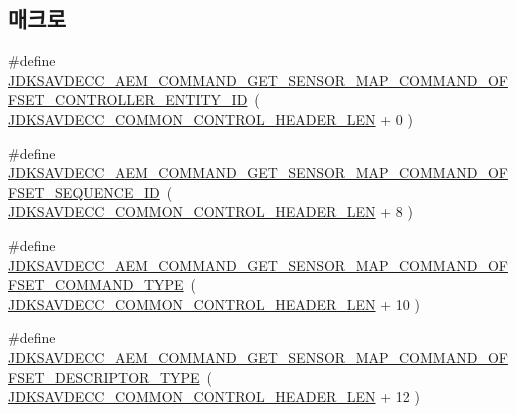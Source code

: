 \subsection*{매크로}
\begin{DoxyCompactItemize}
\item 
\#define \hyperlink{group__command__get__sensor__map_gaa9a59eb95c2f583d5b3abeebe3a434fd}{J\+D\+K\+S\+A\+V\+D\+E\+C\+C\+\_\+\+A\+E\+M\+\_\+\+C\+O\+M\+M\+A\+N\+D\+\_\+\+G\+E\+T\+\_\+\+S\+E\+N\+S\+O\+R\+\_\+\+M\+A\+P\+\_\+\+C\+O\+M\+M\+A\+N\+D\+\_\+\+O\+F\+F\+S\+E\+T\+\_\+\+C\+O\+N\+T\+R\+O\+L\+L\+E\+R\+\_\+\+E\+N\+T\+I\+T\+Y\+\_\+\+ID}~( \hyperlink{group__jdksavdecc__avtp__common__control__header_gaae84052886fb1bb42f3bc5f85b741dff}{J\+D\+K\+S\+A\+V\+D\+E\+C\+C\+\_\+\+C\+O\+M\+M\+O\+N\+\_\+\+C\+O\+N\+T\+R\+O\+L\+\_\+\+H\+E\+A\+D\+E\+R\+\_\+\+L\+EN} + 0 )
\item 
\#define \hyperlink{group__command__get__sensor__map_ga4b0d0dd01100da0863472c2b5c012793}{J\+D\+K\+S\+A\+V\+D\+E\+C\+C\+\_\+\+A\+E\+M\+\_\+\+C\+O\+M\+M\+A\+N\+D\+\_\+\+G\+E\+T\+\_\+\+S\+E\+N\+S\+O\+R\+\_\+\+M\+A\+P\+\_\+\+C\+O\+M\+M\+A\+N\+D\+\_\+\+O\+F\+F\+S\+E\+T\+\_\+\+S\+E\+Q\+U\+E\+N\+C\+E\+\_\+\+ID}~( \hyperlink{group__jdksavdecc__avtp__common__control__header_gaae84052886fb1bb42f3bc5f85b741dff}{J\+D\+K\+S\+A\+V\+D\+E\+C\+C\+\_\+\+C\+O\+M\+M\+O\+N\+\_\+\+C\+O\+N\+T\+R\+O\+L\+\_\+\+H\+E\+A\+D\+E\+R\+\_\+\+L\+EN} + 8 )
\item 
\#define \hyperlink{group__command__get__sensor__map_gad367e17d0f570f99959560ea3fad2a43}{J\+D\+K\+S\+A\+V\+D\+E\+C\+C\+\_\+\+A\+E\+M\+\_\+\+C\+O\+M\+M\+A\+N\+D\+\_\+\+G\+E\+T\+\_\+\+S\+E\+N\+S\+O\+R\+\_\+\+M\+A\+P\+\_\+\+C\+O\+M\+M\+A\+N\+D\+\_\+\+O\+F\+F\+S\+E\+T\+\_\+\+C\+O\+M\+M\+A\+N\+D\+\_\+\+T\+Y\+PE}~( \hyperlink{group__jdksavdecc__avtp__common__control__header_gaae84052886fb1bb42f3bc5f85b741dff}{J\+D\+K\+S\+A\+V\+D\+E\+C\+C\+\_\+\+C\+O\+M\+M\+O\+N\+\_\+\+C\+O\+N\+T\+R\+O\+L\+\_\+\+H\+E\+A\+D\+E\+R\+\_\+\+L\+EN} + 10 )
\item 
\#define \hyperlink{group__command__get__sensor__map_ga2f5606b426b7e84a3dd6a1b39341af38}{J\+D\+K\+S\+A\+V\+D\+E\+C\+C\+\_\+\+A\+E\+M\+\_\+\+C\+O\+M\+M\+A\+N\+D\+\_\+\+G\+E\+T\+\_\+\+S\+E\+N\+S\+O\+R\+\_\+\+M\+A\+P\+\_\+\+C\+O\+M\+M\+A\+N\+D\+\_\+\+O\+F\+F\+S\+E\+T\+\_\+\+D\+E\+S\+C\+R\+I\+P\+T\+O\+R\+\_\+\+T\+Y\+PE}~( \hyperlink{group__jdksavdecc__avtp__common__control__header_gaae84052886fb1bb42f3bc5f85b741dff}{J\+D\+K\+S\+A\+V\+D\+E\+C\+C\+\_\+\+C\+O\+M\+M\+O\+N\+\_\+\+C\+O\+N\+T\+R\+O\+L\+\_\+\+H\+E\+A\+D\+E\+R\+\_\+\+L\+EN} + 12 )
\item 

\end{DoxyCompactItemize}
